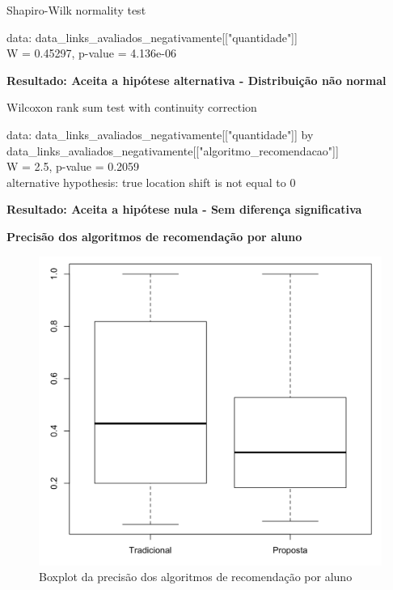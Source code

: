   Shapiro-Wilk normality test

\noindent
data:  data\_links\_avaliados\_negativamente[["quantidade"]]\\
W = 0.45297, p-value = 4.136e-06

\textbf{Resultado: Aceita a hipótese alternativa - Distribuição não normal}

Wilcoxon rank sum test with continuity correction

\noindent
data:  data\_links\_avaliados\_negativamente[["quantidade"]] by \\
data\_links\_avaliados\_negativamente[["algoritmo\_recomendacao"]]\\
W = 2.5, p-value = 0.2059\\
alternative hypothesis: true location shift is not equal to 0

\textbf{Resultado: Aceita a hipótese nula - Sem diferença significativa}

\textbf{Precisão dos algoritmos de recomendação por aluno}

\begin{figure}[htb]
  \caption{\label{fig:precisao-boxplot}Boxplot da precisão dos algoritmos de recomendação por aluno}
  \begin{center}
      \includegraphics[scale=0.4]{./Figuras/precisao-boxplot.png}
  \end{center}
\end{figure}

